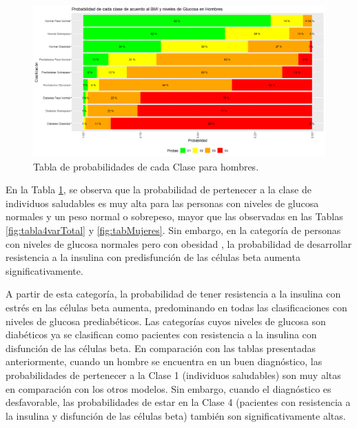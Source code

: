 
\begin{figure}[H]
    \centering
    \includegraphics[height = 10 cm, width = 0.9 \textwidth]{4img/tablaH.png}
    \caption{Tabla de probabilidades de cada Clase para hombres.}
    \label{fig:tabla4varHom}
\end{figure}

En la Tabla \ref{fig:tabla4varHom}, se observa que la probabilidad de pertenecer a la clase de individuos saludables es muy alta para las personas con niveles de glucosa normales y un peso normal o sobrepeso, mayor que las observadas en las Tablas \ref{fig:tabla4varTotal} y \ref{fig:tabMujeres}. Sin embargo, en la categoría de personas con niveles de glucosa normales pero con obesidad , la probabilidad de desarrollar resistencia a la insulina con predisfunción de las células beta aumenta significativamente.

A partir de esta categoría, la probabilidad de tener resistencia a la insulina con estrés en las células beta aumenta, predominando en todas las clasificaciones con niveles de glucosa prediabéticos. Las categorías cuyos niveles de glucosa son diabéticos ya se clasifican como pacientes con resistencia a la insulina con disfunción de las células beta. En comparación con las tablas presentadas anteriormente, cuando un hombre se encuentra en un buen diagnóstico, las probabilidades de pertenecer a la Clase 1 (individuos saludables) son muy altas en comparación con los otros modelos. Sin embargo, cuando el diagnóstico es desfavorable, las probabilidades de estar en la Clase 4 (pacientes con resistencia a la insulina y disfunción de las células beta) también son significativamente altas.

